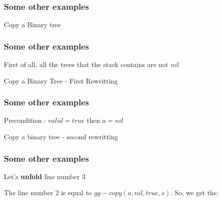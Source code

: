 \documentclass{beamer}
\begin{document}
\begin{frame}
	\frametitle{Some other examples}
	\begin{block}{Copy a Binary tree}
		\begin{algorithmic}[1]
					\State {}
				\Else
					\State {}
				\EndIf
			\EndProcedure
		\end{algorithmic}
	\end{block}
\end{frame}
\begin{frame}
	\frametitle{Some other examples}
	First of all, all the trees that the stack contains are not $nil$
	\begin{block}{Copy a Binary Tree - First Rewritting}
		\tiny
		\begin{algorithmic}[1]
					\State {}
				\Else
						\State{}
					\Else
						\State{}
					\EndIf
				\EndIf
			\EndProcedure
		\end{algorithmic}
	\end{block}
\end{frame}
\begin{frame}
	\frametitle{Some other examples}
	Precondition : $valid = true$ then $a = nil$
	\begin{block}{Copy a binary tree - second rewritting}
		\begin{algorithmic}[1]
					\State {}
				\Else
					\State {}
				\EndIf
			\EndProcedure
		\end{algorithmic}
	\end{block}
\end{frame}
\begin{frame}
	\frametitle{Some other examples}
	Let's \textbf{unfold} line number $3$
	\begin{algorithmic}[1]
			\State{}
		\Else
			\State{}
		\EndIf
	\end{algorithmic}
	The line number $2$ is equal to $gg-copy(a,nil, true, s)$. So, we get ths:
	\begin{algorithmic}[1]
			\State{}
		\Else
			\State{}
		\EndIf
	\end{algorithmic}
	
\end{frame}
\end{document}
